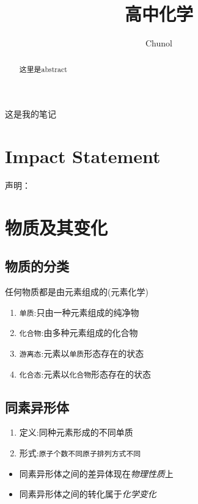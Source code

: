 \documentclass[
  journal=large,
  manuscript=物质及其变化,
  year=2020,
  volume=37,
]{cup-journal}
\title{高中化学}
\author{Chunol}
\affiliation{First Division, 学校, 宁波, 315600, 浙江, 中国}
\begin{document}
\maketitle
\tableofcontents
\CUPTWOCOL 

\begin{abstract}
这里是abstract
\end{abstract}

\noindent  这是我的笔记

\section*{Impact Statement}

声明：

\section{物质及其变化}

\subsection{物质的分类}
    任何物质都是由元素组成的(元素化学)
\begin{enumerate}
    \item \verb|单质|:只由一种元素组成的纯净物
    \item \verb|化合物|:由多种元素组成的化合物
    \item \verb|游离态|:元素以\texttt{单质}形态存在的状态
    \item \verb|化合态|:元素以\texttt{化合物}形态存在的状态
    

\end{enumerate}

\subsection{同素异形体}
    \begin{enumerate}
            \item 定义:同种元素形成的不同单质
            \item 形式:\verb|原子个数不同|\verb|原子排列方式不同|
    \end{enumerate}

    \begin{itemize}
    \item 同素异形体之间的差异体现在\emph{物理性质}上
    \item 同素异形体之间的转化属于\emph{化学变化}
    \end{itemize} 
\end{document}
